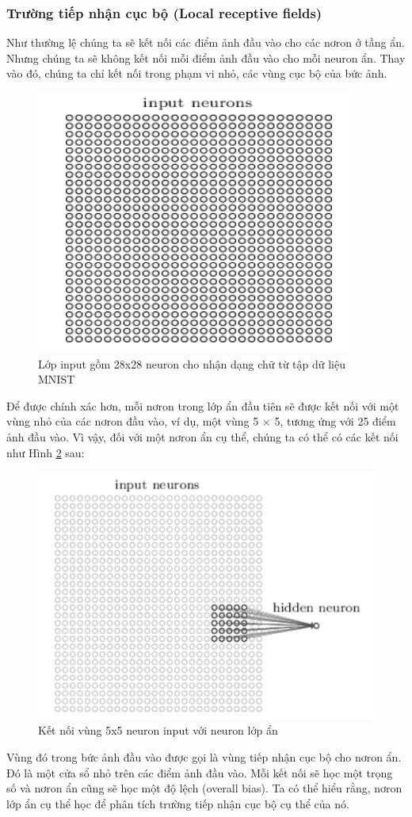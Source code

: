 \subsubsection{Trường tiếp nhận cục bộ (Local receptive fields)}
Như thường lệ chúng ta sẽ kết nối các điểm ảnh đầu vào cho các nơron ở tầng 
ẩn. Nhưng chúng ta sẽ không kết nối mỗi điểm ảnh đầu vào cho mỗi neuron ẩn. Thay 
vào đó, chúng ta chỉ kết nối trong phạm vi nhỏ, các vùng cục bộ của bức ảnh.
\begin{figure}[H]
	\centering
	\includegraphics[width=0.5\linewidth]{images/lopinput.png}
	\caption{Lớp input gồm 28x28 neuron cho nhận dạng chữ từ tập dữ liệu MNIST}
	\label{fig:lopinput}
\end{figure}
Để được chính xác hơn, mỗi nơron trong lớp ẩn đầu tiên sẽ được kết nối với 
một vùng nhỏ của các nơron đầu vào, ví dụ, một vùng 5 × 5, tương ứng với 25 điểm ảnh đầu vào. Vì vậy, đối với một nơron ẩn cụ thể, chúng ta có thể có các kết nối như Hình \ref{fig:ketnoivung} sau:
\begin{figure}[H]
	\centering
	\includegraphics[width=0.6\linewidth]{images/ketnoivung.png}
	\caption{Kết nối vùng 5x5 neuron input với neuron lớp ẩn}
	\label{fig:ketnoivung}
\end{figure}
Vùng đó trong bức ảnh đầu vào được gọi là vùng tiếp nhận cục bộ cho nơron 
ẩn. Đó là một cửa sổ nhỏ trên các điểm ảnh đầu vào. Mỗi kết nối sẽ học một trọng số
và nơron ẩn cũng sẽ học một độ lệch (overall bias). Ta có thể hiểu rằng, nơron lớp ẩn 
cụ thể học để phân tích trường tiếp nhận cục bộ cụ thể của nó.

